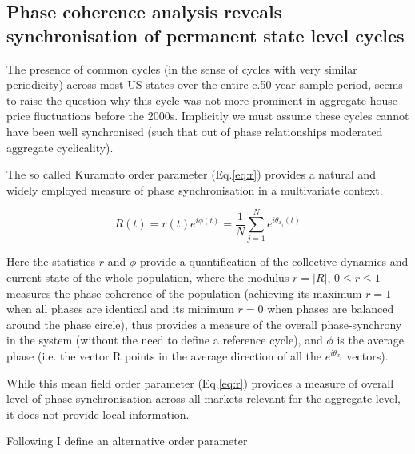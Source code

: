\documentclass[11pt]{article}
\begin{document}
\subsection{Phase coherence analysis reveals synchronisation of permanent state level cycles}

The presence of common cycles (in the sense of cycles with very similar periodicity) across most US states over the entire c.50 year sample period, seems to raise the question why this cycle was not more prominent in aggregate house price fluctuations before the 2000s. Implicitly we must assume these cycles cannot have been well synchronised (such that out of phase relationships moderated aggregate cyclicality).


The so called Kuramoto order parameter (Eq.\ref{eq:r}) provides a %
natural  and widely employed measure of phase synchronisation in a multivariate context.

\begin{equation}
 R(t)=r(t)e^{i\phi(t)}=\frac{1}{N}\sum_{j=1}^{N}e^{i\theta_{x_i}(t)}
 \label{eq:r}
\end{equation}

Here the statistics $r$ and $\phi$ provide a quantification of the collective dynamics and current state of the whole population, where the modulus $r=|R|$,  $0\leq{r}\leq{1}$ measures the phase coherence of the population (achieving its maximum $r=1$ when all phases are identical and its minimum $r=0$ when phases are balanced around the phase circle), thus provides a measure of the overall phase-synchrony in the system (without the need to define a reference cycle), and $\phi$ is the average phase (i.e. the vector R points in the average direction of all the $e^{i\theta_{x_i}}$ vectors). 

While this mean field order parameter (Eq.\ref{eq:r}) provides a measure of overall level of phase synchronisation across all markets relevant for the aggregate level, it does not provide local information. %

Following \cite{Schroder2017} I define an alternative order parameter
\end{document}
